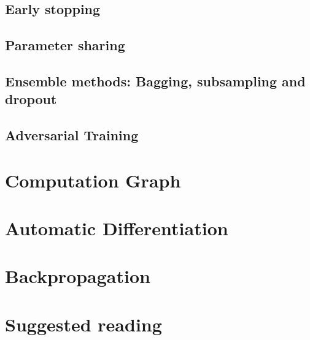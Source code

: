 \subsection{Early stopping}
\subsection{Parameter sharing}
\subsection{Ensemble methods: Bagging, subsampling and dropout}
\subsection{Adversarial Training}

\section{Computation Graph}



\section{Automatic Differentiation}







\section{Backpropagation}

\section{Suggested reading}

